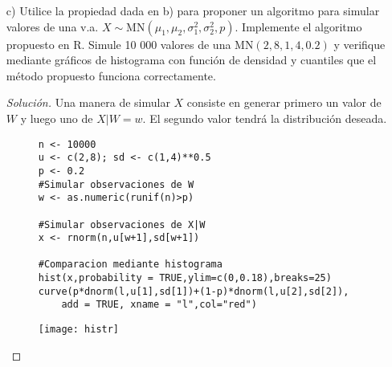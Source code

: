 \documentclass[11pt]{article}
\renewcommand{\=}[1]{\stackrel{#1}{=}} %
\newenvironment{sol}
{\begin{proof}[Solución]}
	{\end{proof}}
\theoremstyle{definition}
\theoremstyle{remark}
\begin{document}
\begin{itemize}
\begin{sol}
		Nos interesa calcular $f_X$, la densidad marginal de $X$, por lo que usamos la regla de probabilidad total con la partición dada por los valores de $W$:
		\begin{eqnarray}
		f_X(x) &=& f_{XW}(x,1) + f_{XW}(x,0)\nonumber\\
		&\stackrel{\mbox{Regla del producto}}{=}& f_W(1)f_{X|W}(x|1) + f_W(0)f_{X|W}(x|0) \nonumber\\
		&\stackrel{\mbox{por (6) y (7)}}{=}& p\phi_1 + (1-p)\phi_2\nonumber\\
		&=& p\phi(x|\mu_1,\sigma_1^2)+(1-p)\phi(x|\mu_2,\sigma_2^2)
		\end{eqnarray}
		Concluimos que $X \sim \text{MN}(\mu_1,\mu_2,\sigma_1^2,\sigma_2^2,p)$.
	\end{sol}
	\item[c)] Utilice la propiedad dada en b) para proponer un algoritmo para simular valores de una v.a. $X \sim \text{MN}(\mu_1,\mu_2,\sigma_1^2,\sigma_2^2,p)$. Implemente el algoritmo propuesto en R. Simule 10 000 valores de una $\text{MN}(2,8,1,4,0.2)$ y verifique mediante gráficos de histograma con función de densidad y cuantiles que el método propuesto funciona correctamente.
	\begin{sol}
		Una manera de simular $X$ consiste en generar primero un valor de $W$ y luego uno de $X|W=w$. El segundo valor tendrá la distribución deseada.
	
	\begin{figure}[h]
		\hspace*{0.9cm}\begin{minipage}{10.3cm}
{
	\begin{lstlisting}[style=myRstyle, caption={Verificación mediante histogramas / MN.}]
n <- 10000
u <- c(2,8); sd <- c(1,4)**0.5
p <- 0.2
#Simular observaciones de W
w <- as.numeric(runif(n)>p)

#Simular observaciones de X|W
x <- rnorm(n,u[w+1],sd[w+1])

#Comparacion mediante histograma
hist(x,probability = TRUE,ylim=c(0,0.18),breaks=25)
curve(p*dnorm(l,u[1],sd[1])+(1-p)*dnorm(l,u[2],sd[2]),
	add = TRUE, xname = "l",col="red")
	\end{lstlisting}
}			
		\end{minipage}
		\begin{minipage}{6cm}
			\texttt{[image: histr]}
		\end{minipage}
	\end{figure}


\end{sol}
\end{itemize}
\end{document}
